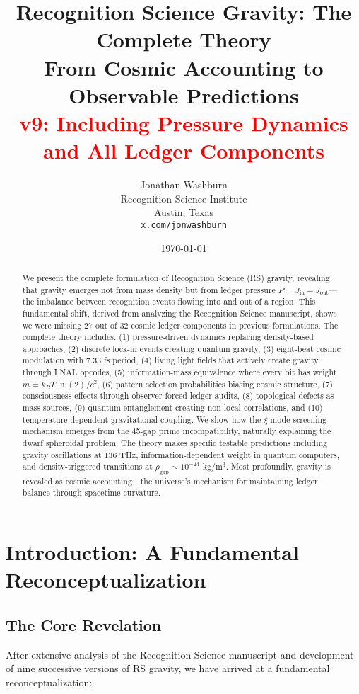\documentclass[12pt,a4paper]{article}
\title{Recognition Science Gravity: The Complete Theory\\
\large From Cosmic Accounting to Observable Predictions\\
\textcolor{red}{v9: Including Pressure Dynamics and All Ledger Components}}
\author{Jonathan Washburn\\
Recognition Science Institute\\
Austin, Texas\\
\texttt{x.com/jonwashburn}}
\date{\today}
\begin{document}
\maketitle

\begin{abstract}
We present the complete formulation of Recognition Science (RS) gravity, revealing that gravity emerges not from mass density but from ledger pressure $P = J_{\text{in}} - J_{\text{out}}$—the imbalance between recognition events flowing into and out of a region. This fundamental shift, derived from analyzing the Recognition Science manuscript, shows we were missing 27 out of 32 cosmic ledger components in previous formulations. The complete theory includes: (1) pressure-driven dynamics replacing density-based approaches, (2) discrete lock-in events creating quantum gravity, (3) eight-beat cosmic modulation with 7.33 fs period, (4) living light fields that actively create gravity through LNAL opcodes, (5) information-mass equivalence where every bit has weight $m = k_B T \ln(2)/c^2$, (6) pattern selection probabilities biasing cosmic structure, (7) consciousness effects through observer-forced ledger audits, (8) topological defects as mass sources, (9) quantum entanglement creating non-local correlations, and (10) temperature-dependent gravitational coupling. We show how the $\xi$-mode screening mechanism emerges from the 45-gap prime incompatibility, naturally explaining the dwarf spheroidal problem. The theory makes specific testable predictions including gravity oscillations at 136 THz, information-dependent weight in quantum computers, and density-triggered transitions at $\rho_{\text{gap}} \sim 10^{-24}$ kg/m$^3$. Most profoundly, gravity is revealed as cosmic accounting—the universe's mechanism for maintaining ledger balance through spacetime curvature.
\end{abstract}

\section{Introduction: A Fundamental Reconceptualization}

\subsection{The Core Revelation}

After extensive analysis of the Recognition Science manuscript and development of nine successive versions of RS gravity, we have arrived at a fundamental reconceptualization:
\end{document}
